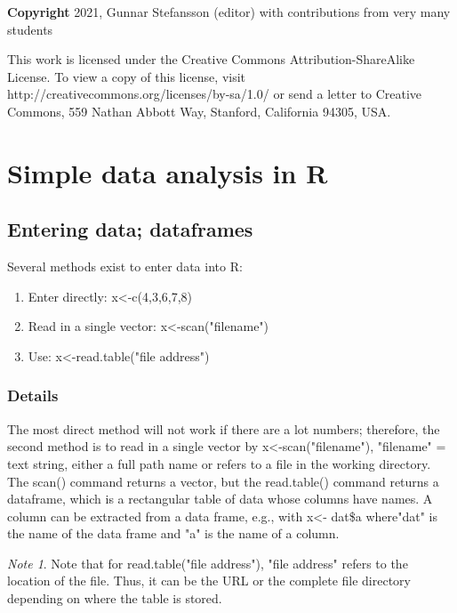 \documentclass[12pt,a4paper]{article}
\theoremstyle{regla}
\theoremstyle{remark}
\newtheorem{notes}{Note}[section]
\theoremstyle{definition}
\theoremstyle{nonumberbreak}
\begin{document}
{\bf Copyright}
2021, Gunnar Stefansson (editor) with contributions from very many students

This work is licensed under the Creative Commons
Attribution-ShareAlike License. To view a copy of this license, visit
http://creativecommons.org/licenses/by-sa/1.0/ or send a letter to
Creative Commons, 559 Nathan Abbott Way, Stanford, California 94305,
USA.
\clearpage
\section{Simple data analysis in R}
\subsection{Entering data; dataframes}
\begin{fbox}
\begin{minipage}{0.97\textwidth}
Several methods exist to enter data into R:

\begin{enumerate}
	\item Enter directly: x<-c(4,3,6,7,8)
	\item Read in a single vector: x<-scan("filename")
	\item Use: x<-read.table("file address")
\end{enumerate}
\end{minipage}
\end{fbox}
\subsubsection{Details}
The most direct method will not work if there are a lot numbers; therefore, the second method is to read in a single vector by x<-scan("filename"), "filename" = text string, either a full path name or refers to a file in the working directory.\\

The scan() command returns a vector, but the read.table() command returns a dataframe, which is a rectangular table of data whose columns have names.  A column can be extracted from a data frame, e.g., with x<- dat\$a where"dat" is the name of the data frame and "a" is the name of a column.

\begin{notes}
Note that for read.table("file address"), "file address" refers to the location of the file.  Thus, it can be the URL or the complete file directory depending on where the table is stored.
\end{notes}
\end{document}
